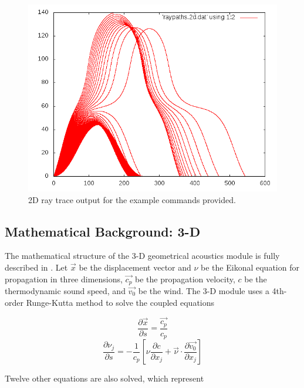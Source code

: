 \begin{figure}
\begin{center}
\includegraphics[scale=0.45]{figs/raytrace2d}
\end{center}
\caption{2D ray trace output for the example commands provided.}
\label{fig:RT2D}
\end{figure}


\subsection{Mathematical Background: 3-D}
\label{sec: raytrace.3d math}

The mathematical structure of the 3-D geometrical acoustics module is fully described in \cite{blom_dissertation}.  Let $\vec{x}$ be the displacement vector and $\nu$ be the Eikonal equation for propagation in three dimensions, $\vec{c_p}$ be the propagation velocity, $c$ be the thermodynamic sound speed, and $\vec{v_0}$ be the wind.  The 3-D module uses a 4th-order Runge-Kutta method to solve the coupled equations

\begin{equation}
\frac{\partial\vec{x}}{\partial s}=\frac{\vec{c_p}}{c_p}
\label{eq: 3d-delxdels}
\end{equation}
\begin{equation}
\frac{\partial\nu_j}{\partial s}=-\frac{1}{c_p} \left[\nu\frac{\partial c}{\partial x_j} + \vec{\nu}\cdot\frac{\partial\vec{v_0}}{\partial x_j}\right]
\label{eq: 3d-delnudels}
\end{equation}

Twelve other equations are also solved, which represent

